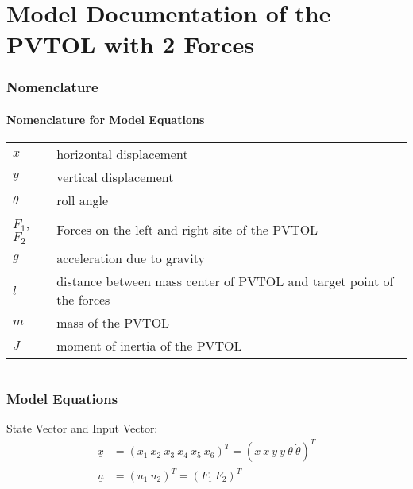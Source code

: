 \documentclass[10pt,a4paper]{article}
\begin{document}
	\part*{Model Documentation of the \\PVTOL with 2 Forces} %
	
	 
	
	
	\section{Nomenclature} %
	\subsection{Nomenclature for Model Equations} %
	
	\begin{tabular}{ll}
		$x$ & horizontal displacement \\
		$y$ & vertical displacement \\
		$\theta$ & roll angle \\
		$F_1$, $F_2$ & Forces on the left and right site of the PVTOL \\
		$g$ & acceleration due to gravity \\
		$l$ & distance between mass center of PVTOL and target point of the forces \\
		$m$ & mass of the PVTOL \\
		$J$ & moment of inertia of the PVTOL		
	\end{tabular}

	
	\begin{tabular}{ll}
	\end{tabular}
	
	
	\section{Model Equations} %
	
	State Vector and Input Vector:
	\begin{align*}
		\underline{x} &= (x_1 \ x_2 \ x_3 \ x_4 \ x_5 \ x_6)^T = (x \ \dot{x} \ y \ \dot{y} \ \theta \ \dot{\theta})^T \\
		\underline{u} &= (u_1 \ u_2)^T = (F_1 \ F_2)^T
	\end{align*}
\end{document}
